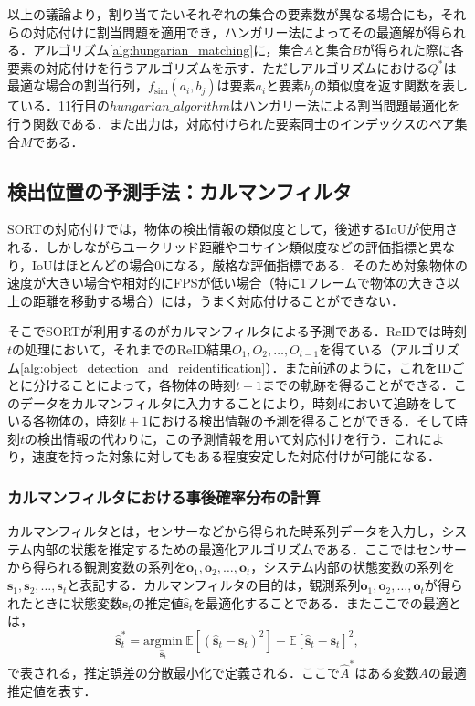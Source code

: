     以上の議論より，割り当てたいそれぞれの集合の要素数が異なる場合にも，それらの対応付けに割当問題を適用でき，ハンガリー法によってその最適解が得られる．アルゴリズム\ref{alg:hungarian_matching}に，集合$A$と集合$B$が得られた際に各要素の対応付けを行うアルゴリズムを示す．ただしアルゴリズムにおける$Q^*$は最適な場合の割当行列，$f_{\text{sim}}(a_i, b_j)$は要素$a_i$と要素$b_j$の類似度を返す関数を表している．11行目の$hungarian\_algorithm$はハンガリー法による割当問題最適化を行う関数である．また出力は，対応付けられた要素同士のインデックスのペア集合$M$である．

    \subsection{検出位置の予測手法：カルマンフィルタ}
    \label{subsec:kalman_filter}

    SORT\cite{bewley2016simple}の対応付けでは，物体の検出情報の類似度として，後述するIoUが使用される．しかしながらユークリッド距離やコサイン類似度などの評価指標と異なり，IoUはほとんどの場合$0$になる，厳格な評価指標である．そのため対象物体の速度が大きい場合や相対的にFPSが低い場合（特に1フレームで物体の大きさ以上の距離を移動する場合）には，うまく対応付けることができない．

    そこでSORTが利用するのがカルマンフィルタによる予測である．ReIDでは時刻$t$の処理において，それまでのReID結果$O_1, O_2, \dots, O_{t-1}$を得ている（アルゴリズム\ref{alg:object_detection_and_reidentification}）．また前述のように，これをIDごとに分けることによって，各物体の時刻$t-1$までの軌跡を得ることができる．このデータをカルマンフィルタに入力することにより，時刻$t$において追跡をしている各物体の，時刻$t+1$における検出情報の予測を得ることができる．そして時刻$t$の検出情報の代わりに，この予測情報を用いて対応付けを行う．これにより，速度を持った対象に対してもある程度安定した対応付けが可能になる．

        \subsubsection{カルマンフィルタにおける事後確率分布の計算}
        \label{subsubsec:kalmanfilter_setting}

        カルマンフィルタ\cite{bishop2001introduction}とは，センサーなどから得られた時系列データを入力し，システム内部の状態を推定するための最適化アルゴリズムである．ここではセンサーから得られる観測変数の系列を$\bm{o}_1, \bm{o}_2, \dots, \bm{o}_t$，システム内部の状態変数の系列を$\bm{s}_1, \bm{s}_2, \dots, \bm{s}_t$と表記する．カルマンフィルタの目的は，観測系列$\bm{o}_1, \bm{o}_2, \dots, \bm{o}_t$が得られたときに状態変数$\bm{s}_t$の推定値$\hat{\bm{s}}_t$を最適化することである．またここでの最適とは，
        \begin{equation}
            \label{eq:kalman_optimality}
            \hat{\bm{s}}_t^* = \underset{\hat{\bm{s}}_t}{\text{argmin}} ~ \mathbb{E}\left[\left(\hat{\bm{s}}_t - \bm{s}_t\right)^2\right] - \mathbb{E}\left[\hat{\bm{s}}_t - \bm{s}_t\right]^2,
        \end{equation}
        で表される，推定誤差の分散最小化で定義される．ここで$\hat{A}^*$はある変数$A$の最適推定値を表す．

